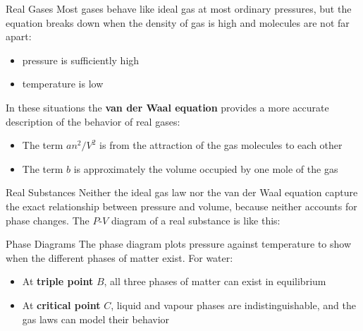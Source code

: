 \documentclass[12pt,aspectratio=169]{beamer}
\begin{document}
\begin{frame}{Real Gases}
  Most gases behave like ideal gas at most ordinary pressures, but the
  equation breaks down when the density of gas is high and molecules are not
  far apart:
  \begin{itemize}
  \item pressure is sufficiently high
  \item temperature is low
  \end{itemize}
  In these situations the \textbf{van der Waal equation} provides a more
  accurate description of the behavior of real gases:


  \begin{itemize}
  \item The term $an^2/V^2$ is from the attraction of the gas molecules to each
    other
  \item The term $b$ is approximately the volume occupied by one mole of the gas
  \end{itemize}
\end{frame}



\begin{frame}{Real Substances}
  Neither the ideal gas law nor the van der Waal equation capture the exact
  relationship between pressure and volume, because neither accounts for phase
  changes. The $P$-$V$ diagram of a real substance is like this:
\end{frame}



\begin{frame}{Phase Diagrams}
  The phase diagram plots pressure against temperature to show when the
  different phases of matter exist. For water:
  \begin{itemize}
  \item\vspace{-.1in} At \textbf{triple point} $B$, all three phases of matter
    can exist in equilibrium
  \item At \textbf{critical point} $C$, liquid and vapour phases are
    indistinguishable, and the gas laws can model their behavior
  \end{itemize}
\end{frame}
\end{document}
